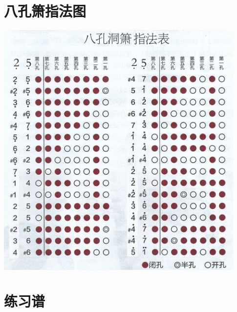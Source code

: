 \documentclass[cn,pad,chinesefont=nofont]{elegantbook}
\begin{document}
\chapter{八孔箫指法图}
\includegraphics[width=0.93\textwidth]{dongxiao/Scan.jpeg}
\chapter{练习谱}
\end{document}
